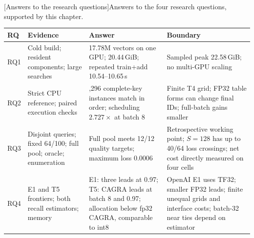 \par\medskip\noindent\begin{minipage}{\linewidth}
\centering\captionsetup{hypcap=false}
[Answers to the research questions]{Answers to the four research questions, supported by this chapter.}
\label{tab:7-rq-answers}
\small
\begin{tabularx}{\linewidth}{@{}l*{3}{>{\raggedright\arraybackslash}X}@{}}
\toprule
RQ & Evidence & Answer & Boundary \\
\midrule
RQ1 & Cold build; resident components; large searches & 17.78M vectors
on one GPU; 20.44\,GiB; repeated train+add 10.54--10.65\,s & Sampled peak 22.58\,GiB; no multi-GPU scaling \\
RQ2 & Strict CPU reference; paired execution checks & 55,296 complete-key
instances match in order; scheduling $2.727\times$ at batch 8 & Finite T4 grid;
FP32 table forms can change final IDs; full-batch gains smaller \\
RQ3 & Disjoint queries; fixed 64/100; full pool; oracle; enumeration & Full pool meets 12/12 quality targets; maximum loss 0.0006 & Retrospective working point; $S=128$ has up to 40/64 loss crossings; net cost directly measured on four cells \\
RQ4 & E1 and T5 frontiers; both recall estimators; memory & E1: three
leads at 0.97; T5: CAGRA leads at batch 8 and 0.97; allocation below
fp32 CAGRA, comparable to int8 & OpenAI E1 uses TF32; smaller FP32 leads;
finite unequal grids and interface costs; batch-32 near ties depend on estimator \\
\bottomrule
\end{tabularx}
\end{minipage}\par\medskip
